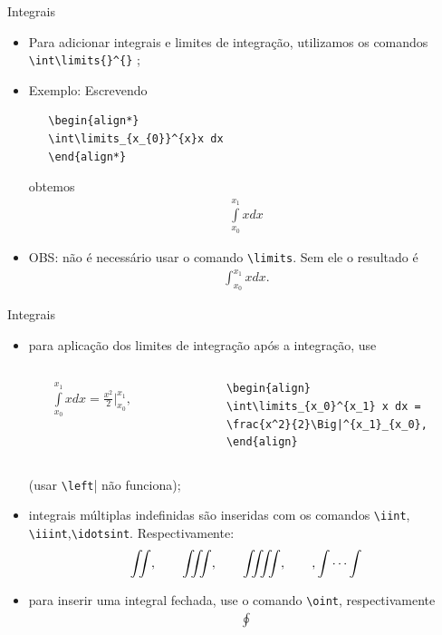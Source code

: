 \documentclass[c]{beamer}
\begin{document}
{\begin{frame}[fragile]{\sc Integrais}
	\begin{itemize}
		\setlength\itemsep{0.3cm}
   \item Para adicionar {\color{blue} integrais} e {\color{blue} limites de integração}, utilizamos os comandos 
   \verb|\int\limits{}^{}| ;
   \item Exemplo: Escrevendo \\
\begin{verbatim}
   \begin{align*}
   \int\limits_{x_{0}}^{x}x dx 
   \end{align*}
\end{verbatim}
   obtemos
   \begin{align*}
   \int\limits_{x_{0}}^{x_1}x dx 
   \end{align*}
   \item OBS: não é necessário usar o comando \verb|\limits|. Sem ele o resultado é 
   \begin{align*}
   \int_{x_{0}}^{x_1}x dx.
   \end{align*}   
	\end{itemize}
\end{frame}


\begin{frame}[fragile]{\sc Integrais}
	\begin{itemize}
		\setlength\itemsep{0.3cm}
		\item para aplicação dos {\color{blue} limites de integração} após a integração, use 
\begin{columns}
	\begin{column}{0.4\textwidth}
		\begin{align}
		\int\limits_{x_0}^{x_1} x dx = \frac{x^2}{2}\Big|^{x_1}_{x_0},
		\end{align}
	\end{column}
	\begin{column}{0.6\textwidth}
		\begin{verbatim}
		\begin{align}
		\int\limits_{x_0}^{x_1} x dx = 
		\frac{x^2}{2}\Big|^{x_1}_{x_0},
		\end{align}
		\end{verbatim}
	\end{column}
\end{columns}
		(usar \verb|\left|| não funciona);
        \item {\color{blue} integrais múltiplas indefinidas} são inseridas com 
        os comandos \verb|\iint|, \verb|\iiint|,\verb|\idotsint|.  Respectivamente: 
        \begin{align}
        \iint, \qquad \iiint, \qquad \iiiint, \qquad, \idotsint
        \end{align}
        \item para inserir uma {\color{blue} integral fechada}, use o 
        comando \verb|\oint|, respectivamente 
        \begin{align}
        \oint
        \end{align}
	\end{itemize}
\end{frame}


}
\end{document}
